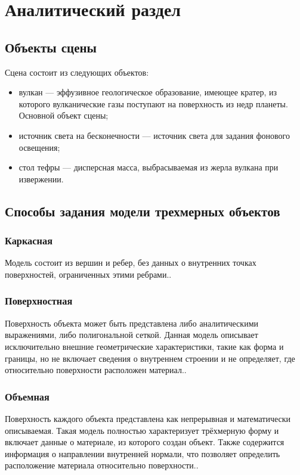 \chapter{Аналитический раздел}
\section{Объекты сцены}
Сцена состоит из следующих объектов:
\begin{itemize}
	\item вулкан --- эффузивное геологическое образование, имеющее кратер, из которого вулканические газы поступают на поверхность из недр планеты. Основной объект сцены;
	\item источник света на бесконечности --- источник света для задания фонового освещения;
	\item стол тефры --- дисперсная масса, выбрасываемая из жерла вулкана при извержении.
\end{itemize}

\section{Способы задания модели трехмерных объектов}

\subsection{Каркасная}
Модель состоит из вершин и ребер, без данных о внутренних точках поверхностей, ограниченных этими ребрами.\cite{lit2}.

\subsection{Поверхностная}
Поверхность объекта может быть представлена либо аналитическими выражениями, либо полигональной сеткой. Данная модель описывает исключительно внешние геометрические характеристики, такие как форма и границы, но не включает сведения о внутреннем строении и не определяет, где относительно поверхности расположен материал.\cite{lit2}.

\subsection{Объемная}
Поверхность каждого объекта представлена как непрерывная и математически описываемая. Такая модель полностью характеризует трёхмерную форму и включает данные о материале, из которого создан объект. Также содержится информация о направлении внутренней нормали, что позволяет определить расположение материала относительно поверхности.\cite{lit2}.



